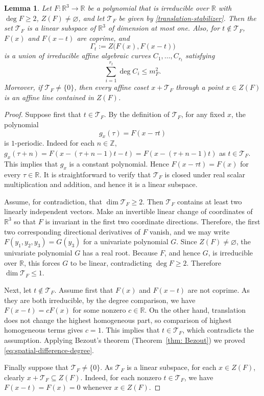 \documentclass{amsart}%
\numberwithin{equation}{section}
\newtheorem{lemma}[theorem]{Lemma}
\newcommand{\ZR}{\mathbb{R}}
\newcommand{\cT}{{\mathcal T}}
\newcommand{\R}{\mathbb{R}}
\newcommand{\1}{\mathbbm{1}}
\begin{document}
\begin{lemma}
\label{difference-curve-lem}
Let $F:\ZR^3\to\ZR$ be a polynomial that is irreducible over $\R$ with $\deg F\geq2$, $Z(F)\neq\varnothing$, and let $\cT_F$ be given by \eqref{translation-stabilizer}.
Then the set $\mathcal T_F$ is a linear subspace of $\R^3$ of dimension at most one. 
Also, for $t\notin\mathcal T_F$, $F(x)$ and $F(x-t)$ are coprime, and
\begin{equation}
\label{eq:def-spatial-difference-curve}
    \Gamma_t:=Z\bigl(F(x),F(x-t)\bigr)
\end{equation}
is a union of irreducible affine algebraic curves $C_{1},\dots,C_{r_t}$ satisfying
\begin{equation}
\label{eq:spatial-difference-degree}
    \sum_{i=1}^{r_t}\deg C_{i}\leq m_F^2.
\end{equation}
Moreover, if $\mathcal T_F\neq\{0\}$, then every affine coset $x+\mathcal T_F$ through a point $x\in Z(F)$ is an affine line contained in $Z(F)$.  
\end{lemma}

\begin{proof}
Suppose first that $t\in\mathcal T_F$.  By the definition of $\mathcal T_F$, for any fixed $x$, the polynomial
\[
    g_x(\tau)=F(x-\tau t)
\]
is $1$-periodic. 
Indeed for each $n\in\mathbb Z$, $g_x(\tau + n ) = F(x-(\tau+n-1)t-t)=F(x-(\tau+n-1)t)$ as $t\in\mathcal T_F$. 
This implies that $g_x$ is a constant polynomial. 
Hence $F(x-\tau t)=F(x)$ for every $\tau\in\R$. 
It is straightforward to verify that $\mathcal T_F$ is closed under real scalar multiplication and addition, and hence it is a linear subspace.

Assume, for contradiction, that $\dim\mathcal T_F\geq2$.
Then $\mathcal T_F$ contains at least two linearly independent vectors. 
Make an invertible linear change of coordinates of $\R^3$ so that $F$ is invariant in the first two coordinate directions. 
Therefore, the first two corresponding directional derivatives of $F$ vanish, and we may write $F(y_1,y_2,y_3)=G(y_3)$ for a univariate polynomial $G$.
Since $Z(F)\not=\varnothing$, the univariate polynomial $G$ has a real root. 
Because $F$, and hence $G$, is irreducible over $\ZR$, this forces $G$ to be linear, contradicting $\deg F\geq 2$.
Therefore $\dim\mathcal T_F\leq1$.

\smallskip

Next, let $t\notin\mathcal T_F$. 
Assume first that $F(x)$ and $F(x-t)$ are not coprime. 
As they are both irreducible, by the degree comparison, we have $F(x-t)=cF(x)$ for some nonzero $c\in\R$. 
On the other hand, translation does not change the highest homogeneous part, so comparison of highest homogeneous terms gives $c=1$. 
This implies that $t\in\mathcal T_F$, which contradicts the assumption. 
Applying Bezout's theorem (Theorem~\ref{thm: Bezout}) we proved \eqref{eq:spatial-difference-degree}.

\smallskip 

Finally suppose that $\mathcal T_F\neq\{0\}$. As $\mathcal T_F$ is a linear subspace, for each $x\in Z(F)$, clearly $x+\mathcal T_F\subseteq Z(F)$. 
Indeed, for each nonzero $t\in \mathcal T_F$, we have $F(x-t)=F(x)=0$ whenever $x\in Z(F)$. 
\end{proof}
\end{document}
